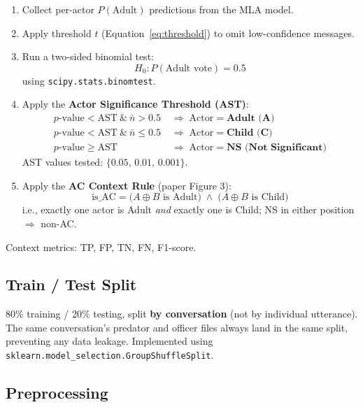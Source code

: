 \documentclass[12pt,a4paper]{article}
\begin{document}
\begin{enumerate}[leftmargin=*, label=\textbf{Step \arabic*.}]
  \item Collect per-actor $P(\text{Adult})$ predictions from the MLA model.
  \item Apply threshold $t$ (Equation~\ref{eq:threshold}) to omit
        low-confidence messages.
  \item Run a two-sided binomial test:
        \[
          H_0: P(\text{Adult vote}) = 0.5
        \]
        using \texttt{scipy.stats.binomtest}.
  \item Apply the \textbf{Actor Significance Threshold (AST)}:
        \begin{align*}
          p\text{-value} < \text{AST}\ \&\ \bar{n} > 0.5
            &\;\Rightarrow\; \text{Actor} = \textbf{Adult (A)} \\
          p\text{-value} < \text{AST}\ \&\ \bar{n} \leq 0.5
            &\;\Rightarrow\; \text{Actor} = \textbf{Child (C)} \\
          p\text{-value} \geq \text{AST}
            &\;\Rightarrow\; \text{Actor} = \textbf{NS (Not Significant)}
        \end{align*}
        AST values tested: $\{0.05,\, 0.01,\, 0.001\}$.
  \item Apply the \textbf{AC Context Rule} (paper Figure 3):
        \begin{equation}
          \text{is\_AC} =
            \bigl(A \oplus B \text{ is Adult}\bigr)
            \;\wedge\;
            \bigl(A \oplus B \text{ is Child}\bigr)
          \label{eq:ac_rule}
        \end{equation}
        i.e., exactly one actor is Adult \emph{and} exactly one is Child;
        NS in either position $\Rightarrow$ non-AC.
\end{enumerate}

Context metrics: TP, FP, TN, FN, F1-score.

\subsection{Train / Test Split}

80\% training / 20\% testing, split \textbf{by conversation} (not by
individual utterance). The same conversation's predator and officer files
always land in the same split, preventing any data leakage.
Implemented using \texttt{sklearn.model\_selection.GroupShuffleSplit}.

\subsection{Preprocessing}
\end{document}
